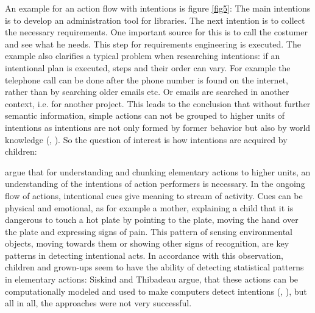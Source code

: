An example for an action flow with intentions is figure \ref{fig5}: The main intentions is to develop an administration tool for libraries. The next intention is to collect the necessary requirements. One important source for this is to call the costumer and see what he needs. This step for requirements engineering is executed. The example also clarifies a typical problem when researching intentions: if an intentional plan is executed, steps and their order can vary. For example the telephone call can be done after the phone number is found on the internet, rather than by searching older emails etc. Or emails are searched in another context, i.e. for another project. This leads to the conclusion that without further semantic information, simple actions can not be grouped to higher units of intentions as intentions are not only formed by former behavior but also by world knowledge (\cite{baldwin2001discerning}, \cite{bandura1977social}). So the question of interest is how intentions are acquired by children:

\cite{baldwin2001discerning} argue that for understanding and chunking elementary actions to higher units, an understanding of the intentions of action performers is necessary. In the ongoing flow of actions, intentional cues give meaning to stream of activity. Cues can be physical and emotional, as for example a mother, explaining a child that it is dangerous to touch a hot plate by pointing to the plate, moving the hand over the plate and expressing signs of pain. This pattern of sensing environmental objects, moving towards them or showing other signs of recognition, are key patterns in detecting intentional acts. 
In accordance with this observation, children and grown-ups seem to have the ability of detecting statistical patterns in elementary actions: Siskind and Thibadeau argue, that these actions can be computationally modeled and used to make computers detect intentions (\cite{thibadeau1986artificial}, \cite{siskind1995grounding}), but all in all, the approaches were not very successful. 

